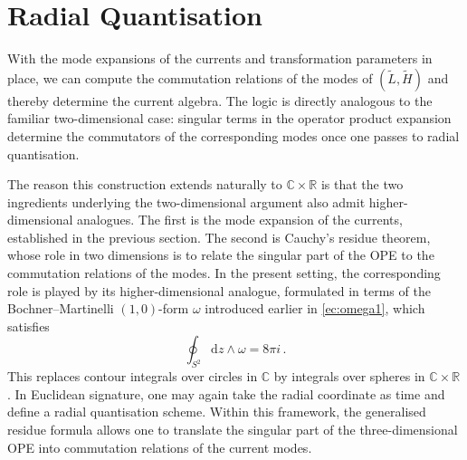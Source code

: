 \documentclass[11pt]{amsart}
\newcommand{\R}{{\mathbb R}}
\newcommand{\C}{{\mathbb C}}
\numberwithin{equation}{section}
\numberwithin{figure}{section}
\numberwithin{table}{section}
\renewcommand{\d}{\mathrm{d}}
\theoremstyle{thm}
\numberwithin{equation}{subsection}
\theoremstyle{definition}
\theoremstyle{rem}
\begin{document}








\section{Radial Quantisation}\label{affineraviolo}

With the mode expansions of the currents and transformation parameters in place, we can compute the commutation relations of the modes of $(\tilde L, \tilde H)$ and thereby determine the current algebra. The logic is directly analogous to the familiar two-dimensional case: singular terms in the operator product expansion determine the commutators of the corresponding modes once one passes to radial quantisation.

The reason this construction extends naturally to $\C\times\R$ is that the two ingredients underlying the two-dimensional argument also admit higher-dimensional analogues. The first is the mode expansion of the currents, established in the previous section. The second is Cauchy's residue theorem, whose role in two dimensions is to relate the singular part of the OPE to the commutation relations of the modes. In the present setting, the corresponding role is played by its higher-dimensional analogue, formulated in terms of the Bochner--Martinelli $(1,0)$-form $\omega$ introduced earlier in \eqref{ec:omega1}, which satisfies
\begin{equation}
\label{ec:intomegaes8pi}
    \oint_{S^2} \d z \wedge \omega = 8\pi i \, .
\end{equation}
This replaces contour integrals over circles in $\C$ by integrals over spheres in $\C\times\R$. In Euclidean signature, one may again take the radial coordinate as time and define a radial quantisation scheme. Within this framework, the generalised residue formula allows one to translate the singular part of the three-dimensional OPE into commutation relations of the current modes.
\end{document}
